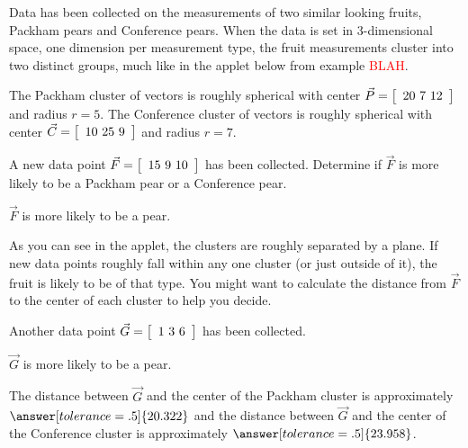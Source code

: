 \documentclass{ximera}
\author{Zack Reed}
\begin{document}
\begin{exercise}

  Data has been collected on the measurements of two similar looking fruits, Packham pears and Conference pears. When the data is set in 3-dimensional space, one dimension per measurement type, the fruit measurements cluster into two distinct groups, much like in the applet below from example \textcolor{red}{BLAH}.

  \begin{center}
  \end{center}

  The Packham cluster of vectors is roughly spherical with center $\vec{P} = \startmat{c} 20 \ 7 \ 12 \stopmat$ and radius $r = 5$. The Conference cluster of vectors is roughly spherical with center $\vec{C} = \startmat{c} 10 \ 25 \ 9 \stopmat$ and radius $r = 7$.

  A new data point $\vec{F} = \startmat{c} 15 \ 9 \ 10 \stopmat$ has been collected. Determine if $\vec{F}$ is more likely to be a Packham pear or a Conference pear.
  
  $\vec{F}$ is more likely to be a 
     pear. 
  
  \begin{hint}
  
  As you can see in the applet, the clusters are roughly separated by a plane. If new data points roughly fall within any one cluster (or just outside of it), the fruit is likely to be of that type. You might want to calculate the distance from $\vec{F}$ to the center of each cluster to help you decide.
  
  \end{hint}
  
  Another data point $\vec{G} = \startmat{c} 1 \ 3 \ 6 \stopmat$ has been collected.
  
  $\vec{G}$ is more likely to be a 
    pear.
  
  The distance between $\vec{G}$ and the center of the Packham cluster is approximately $\answer[tolerance=.5]{20.322}$ and the distance between $\vec{G}$ and the center of the Conference cluster is approximately $\answer[tolerance=.5]{23.958}$.

\end{exercise}
\end{document}
